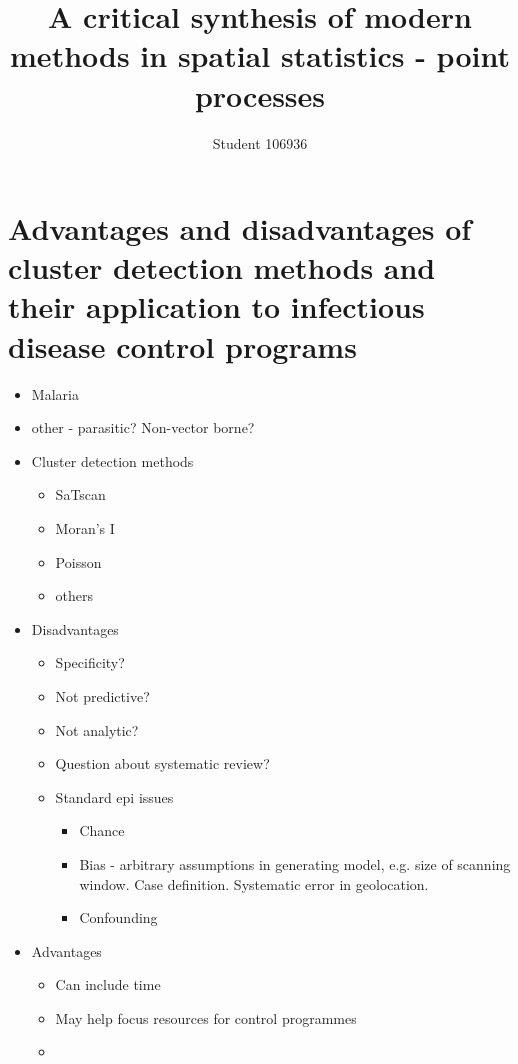 \documentclass[a4paper,11pt]{article}
\title{A critical synthesis of modern methods in spatial statistics - point processes}
\author{Student 106936}
\begin{document}
\maketitle



\section{Advantages and disadvantages of cluster detection methods and their application to infectious disease control programs}
\begin{itemize}
 \item Malaria
 \item other - parasitic? Non-vector borne?
\end{itemize}

\begin{itemize}
 \item Cluster detection methods 
 \begin{itemize}
  \item SaTscan
  \item Moran's I
  \item Poisson
  \item others
 \end{itemize}
 \item Disadvantages
 \begin{itemize}
  \item Specificity?
  \item Not predictive?
  \item Not analytic?
  \item Question about systematic review?
  \item Standard epi issues
  \begin{itemize}
   \item Chance
   \item Bias - arbitrary assumptions in generating model, e.g. size of scanning window. Case definition. Systematic error in geolocation. 
   \item Confounding
  \end{itemize}

 \end{itemize}
 \item Advantages
 \begin{itemize}
  \item Can include time
  \item May help focus resources for control programmes
  \item 
 \end{itemize}

\end{itemize}
\end{document}
